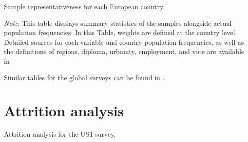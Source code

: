 \begin{table}[h]
    \caption[Sample representativeness of each European country]{Sample representativeness for each European country.} \label{tab:representativeness_EU}
    \makebox[\textwidth][c]{
        \resizebox*{!}{.50\textheight}{%
        
        }
    }
    {\footnotesize \textit{Note}: This table displays summary statistics of the samples alongside actual population frequencies. In this Table, weights are defined at the country level.  %
    Detailed sources for each variable and country population frequencies, as well as the definitions of regions, diploma, urbanity, employment, and vote are available in %
    }
\end{table}

Similar tables for the global surveys can be found in \citet{dechezlepretre_fighting_2022}.

\clearpage
\section{Attrition analysis}\label{app:attrition}

\begin{table}[h]\label{tab:attrition_US1}
    \caption[Attrition analysis: US1]{Attrition analysis for the US1 survey.} 
    \makebox[\textwidth][c]{
\resizebox*{!}{.73\textheight}{ %
        
        }
    }
    {\footnotesize %
    }
\end{table}

